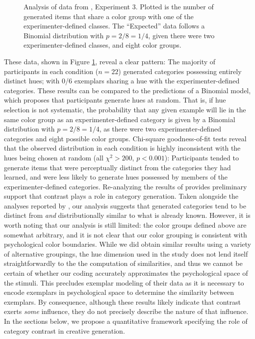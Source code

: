 \documentclass[12pt]{article}
\newcommand\inputpgf[2]{{
\let\pgfimageWithoutPath\pgfimage
\renewcommand{\pgfimage}[2][]{\pgfimageWithoutPath[##1]{#1/##2}}

}}
\newcommand\jlanote[1]{\todo[inline, backgroundcolor = lime]{\textbf{JLA}: #1}}
\begin{document}
\begin{flushleft}
\begin{figure}
    \begin{center}
        \inputpgf{figs/}{jk13-huecontrast.pgf}
        \caption{Analysis of data from \cite{jern2013probabilistic}, Experiment 3. Plotted is the number of generated items that share a color group with one of the experimenter-defined classes. The ``Expected'' data follows a Binomial distribution with $p=2/8=1/4$, given there were two experimenter-defined classes, and eight color groups.}
        \label{fig:jk13-huecontrast}
    \end{center}
\end{figure}

These data, shown in Figure \ref{fig:jk13-huecontrast}, reveal a clear pattern: The majority of participants in each condition ($n = 22$) generated categories possessing entirely distinct hues; with 0/6 exemplars sharing a hue with the experimenter-defined categories. These results can be compared to the predictions of a Binomial model, which proposes that participants generate hues at random. That is, if hue selection is not systematic, the probability that any given example will lie in the same color group as an experimenter-defined category is given by a Binomial distribution with $p = 2/8=1/4$, as there were two experimenter-defined categories and eight possible color groups. Chi-square goodness-of-fit tests reveal that the observed distribution in each condition is highly inconsistent with the hues being chosen at random (all $\chi^2>200$, $p<0.001$): Participants tended to generate items that were perceptually distinct from the categories they had learned, and were less likely to generate hues possessed by members of the experimenter-defined categories.
\jlanote{need degrees of freedom for $\chi^2$ tests}
Re-analyzing the results of \cite{jern2013probabilistic} provides preliminary support that contrast plays a role in category generation. Taken alongside the analyses reported by \cite{jern2013probabilistic}, our analysis suggests that generated categories tend to be distinct from {\em and} distributionally similar to what is already known. However, it is worth noting that our analysis is still limited: the color groups defined above are somewhat arbitrary, and it is not clear that our color grouping is consistent with psychological color boundaries. While we did obtain similar results using a variety of alternative groupings, the hue dimension used in the \cite{jern2013probabilistic} study does not lend itself straightforwardly to the the computation of similarities, and thus we cannot be certain of whether our coding accurately approximates the psychological space of the stimuli. This precludes exemplar modeling of their data as it is necessary to encode exemplars in psychological space to determine the similarity between exemplars. By consequence, although these results likely indicate that contrast exerts {\em some} influence, they do not precisely describe the nature of that influence. In the sections below, we propose a quantitative framework specifying the role of category contrast in creative generation.



\end{flushleft}
\end{document}
